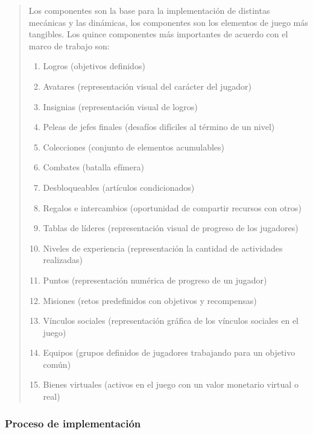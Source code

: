  \begin{quote}
    Los componentes son la base para la implementación de distintas mecánicas y las dinámicas,
    los componentes son los elementos de juego más tangibles. Los quince componentes más importantes
    de acuerdo con el marco de trabajo son:

    \begin{enumerate}
        \item Logros (objetivos definidos)
        \item Avatares (representación visual del carácter del jugador)
        \item Insignias (representación visual de logros)
        \item Peleas de jefes finales (desafíos difíciles al término de un nivel)
        \item Colecciones (conjunto de elementos acumulables)
        \item Combates (batalla efímera)
        \item Desbloqueables (artículos condicionados)
        \item Regalos e intercambios (oportunidad de compartir recursos con otros)
        \item Tablas de líderes (representación visual de progreso de los jugadores)
        \item Niveles de experiencia (representación la cantidad de actividades realizadas)
        \item Puntos (representación numérica de progreso de un jugador)
        \item Misiones (retos predefinidos con objetivos y recompensas)
        \item Vínculos sociales (representación gráfica de los vínculos sociales en el juego)
        \item Equipos (grupos definidos de jugadores trabajando para un objetivo común)
        \item Bienes virtuales (activos en el juego con un valor monetario virtual o real)
    \end{enumerate}
 \end{quote}


\subsubsection{Proceso de implementación}

